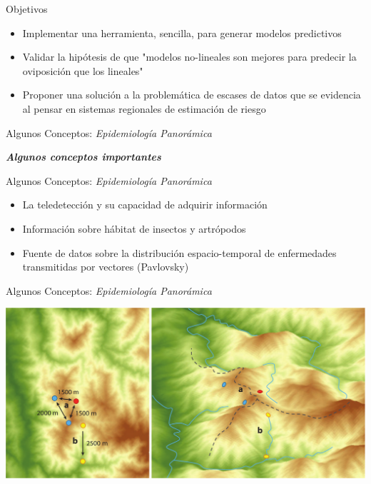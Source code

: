 \documentclass[10pt]{beamer}
\newcommand\IncrFont{\fontsize{20}{20}\selectfont}
\begin{document}
\begin{frame}{Objetivos}
  \pause
  \begin{itemize}[<+->]
   \item Implementar una herramienta, sencilla, para generar modelos predictivos
   \item Validar la hipótesis de que "modelos no-lineales son mejores para predecir la oviposición que los lineales"
   \item Proponer una solución a la problemática de escases de datos que se evidencia al pensar en sistemas regionales de estimación de riesgo

  \end{itemize}

\end{frame}


\begin{frame}{Algunos Conceptos: \textit{Epidemiología Panorámica}}
\IncrFont
  \begin{center}
    \textit{\textbf{Algunos conceptos importantes}}
  \end{center}

\end{frame}


\begin{frame}{Algunos Conceptos: \textit{Epidemiología Panorámica}}
  \pause
  \begin{itemize}[<+->]
   \item La teledetección y su capacidad de adquirir información
   \item Información sobre hábitat de insectos y artrópodos
   \item Fuente de datos sobre la distribución espacio-temporal de enfermedades
         transmitidas por vectores (Pavlovsky)
  \end{itemize}

\end{frame}


\begin{frame}{Algunos Conceptos: \textit{Epidemiología Panorámica}}
  \begin{center}
    \includegraphics[width=1\textwidth]{paisajes_heterogeneos}
  \end{center}
\end{frame}
\end{document}
